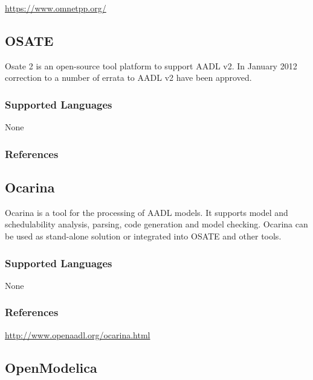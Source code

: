 \url{https://www.omnetpp.org/}



\subsection{OSATE}
\label{subsecT:OSATE}

Osate 2 is an open-source tool platform to support AADL v2. In January 2012 correction to a number of errata to AADL v2 have been approved.

\subsubsection{Supported Languages}

None


\subsubsection{References}





\subsection{Ocarina}
\label{subsecT:Ocarina}


Ocarina is a tool for the processing of AADL models. 
It supports model and schedulability analysis, parsing, code generation and model checking.
Ocarina can be used as stand-alone solution or integrated into OSATE and other tools.

\subsubsection{Supported Languages}

None


\subsubsection{References}

\url{http://www.openaadl.org/ocarina.html}



\subsection{OpenModelica}
\label{subsecT:OpenModelica}

